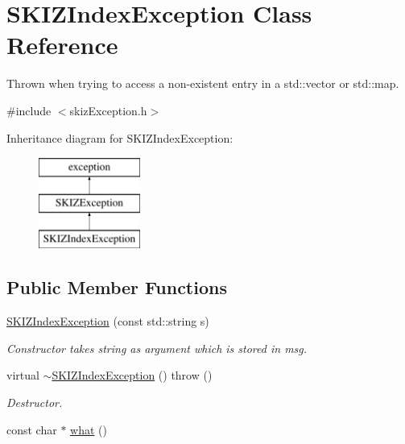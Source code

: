 \hypertarget{classSKIZIndexException}{}\section{S\+K\+I\+Z\+Index\+Exception Class Reference}
\label{classSKIZIndexException}


Thrown when trying to access a non-\/existent entry in a std\+::vector or std\+::map.  




{\ttfamily \#include $<$skiz\+Exception.\+h$>$}

Inheritance diagram for S\+K\+I\+Z\+Index\+Exception\+:\begin{figure}[H]
\begin{center}
\leavevmode
\includegraphics[height=3.000000cm]{classSKIZIndexException}
\end{center}
\end{figure}
\subsection*{Public Member Functions}
\begin{DoxyCompactItemize}
\item 
\mbox{\hyperlink{classSKIZIndexException_abd89a7895a20077dbb514271c6455f75}{S\+K\+I\+Z\+Index\+Exception}} (const std\+::string s)
\begin{DoxyCompactList}\small\item\em Constructor takes string as argument which is stored in msg. \end{DoxyCompactList}\item 
virtual \mbox{\hyperlink{classSKIZIndexException_ad41e9aa637c94d9e559f84333c6fafb5}{$\sim$\+S\+K\+I\+Z\+Index\+Exception}} ()  throw ()
\begin{DoxyCompactList}\small\item\em Destructor. \end{DoxyCompactList}\item 
const char $\ast$ \mbox{\hyperlink{classSKIZIndexException_a9f02457a3301bf0618023b25f8d79007}{what}} ()
\end{DoxyCompactItemize}


